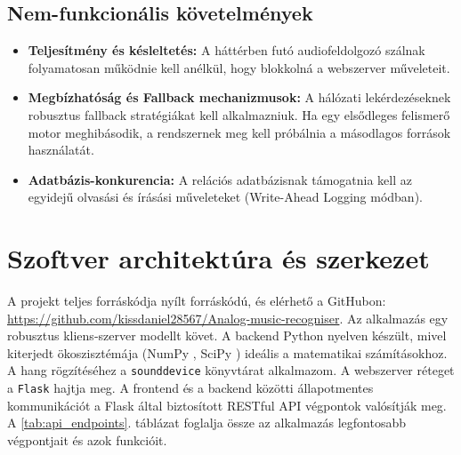 \subsection{Nem-funkcionális követelmények}
\begin{itemize}
    \item \textbf{Teljesítmény és késleltetés:} A háttérben futó audiofeldolgozó szálnak folyamatosan működnie kell anélkül, hogy blokkolná a webszerver műveleteit. 
    \item \textbf{Megbízhatóság és Fallback mechanizmusok:} A hálózati lekérdezéseknek robusztus fallback stratégiákat kell alkalmazniuk. Ha egy elsődleges felismerő motor meghibásodik, a rendszernek meg kell próbálnia a másodlagos források használatát.
    \item \textbf{Adatbázis-konkurencia:} A relációs adatbázisnak támogatnia kell az egyidejű olvasási és írásási műveleteket (Write-Ahead Logging módban).
\end{itemize}

\section{Szoftver architektúra és szerkezet}
A projekt teljes forráskódja nyílt forráskódú, és elérhető a GitHubon: \url{https://github.com/kissdaniel28567/Analog-music-recogniser}. Az alkalmazás egy robusztus kliens-szerver modellt követ. A backend Python nyelven készült, mivel kiterjedt ökoszisztémája (NumPy \cite{numpy}, SciPy \cite{scipy}) ideális a matematikai számításokhoz. A hang rögzítéséhez a \texttt{sounddevice} \cite{sounddevice} könyvtárat alkalmazom. A webszerver réteget a \texttt{Flask} \cite{flask} hajtja meg.
A frontend és a backend közötti állapotmentes kommunikációt a Flask által biztosított RESTful API végpontok valósítják meg. A \ref{tab:api_endpoints}. táblázat foglalja össze az alkalmazás legfontosabb végpontjait és azok funkcióit.


